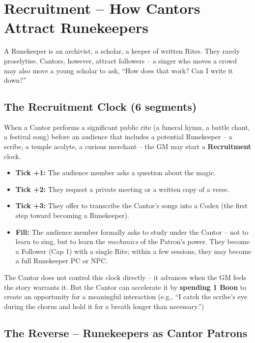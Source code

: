 \documentclass[10pt,a5paper]{book}
\begin{document}
\section{Recruitment – How Cantors Attract Runekeepers}

A Runekeeper is an archivist, a scholar, a keeper of written Rites. They rarely proselytise. Cantors, however, attract followers – a singer who moves a crowd may also move a young scholar to ask, “How does that work? Can I write it down?”

\subsection*{The Recruitment Clock (6 segments)}

When a Cantor performs a significant public rite (a funeral hymn, a battle chant, a festival song) before an audience that includes a potential Runekeeper – a scribe, a temple acolyte, a curious merchant – the GM may start a \textbf{Recruitment} clock.

\begin{itemize}
    \item \textbf{Tick +1:} The audience member asks a question about the magic.
    \item \textbf{Tick +2:} They request a private meeting or a written copy of a verse.
    \item \textbf{Tick +3:} They offer to transcribe the Cantor’s songs into a Codex (the first step toward becoming a Runekeeper).
    \item \textbf{Fill:} The audience member formally asks to study under the Cantor – not to learn to sing, but to learn the \textit{mechanics} of the Patron’s power. They become a Follower (Cap 1) with a single Rite; within a few sessions, they may become a full Runekeeper PC or NPC.
\end{itemize}

The Cantor does not control this clock directly – it advances when the GM feels the story warrants it. But the Cantor can accelerate it by \textbf{spending 1 Boon} to create an opportunity for a meaningful interaction (e.g., “I catch the scribe’s eye during the chorus and hold it for a breath longer than necessary.”)

\subsection*{The Reverse – Runekeepers as Cantor Patrons}
\end{document}
